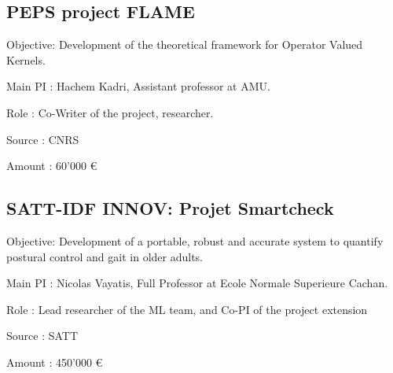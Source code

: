 \documentclass[letter,10pt]{article}
\begin{document}
\subsection{PEPS project FLAME}
\begin{zitemize}
\item Objective: Development of the theoretical framework for Operator Valued Kernels.
\item Main PI : Hachem Kadri, Assistant professor at AMU.
\item Role : Co-Writer of the project, researcher.
\item Source : CNRS
\item Amount : 60'000 \euro
\end{zitemize}

\subsection{SATT-IDF INNOV: Projet Smartcheck}
\begin{zitemize}
\item Objective: Development of a portable, robust and accurate system to quantify postural control and gait in older adults.
\item Main PI : Nicolas Vayatis, Full Professor at Ecole Normale Superieure Cachan.
\item Role : Lead researcher of the ML team, and Co-PI of the project extension
\item Source : SATT
\item Amount : 450'000 \euro
\end{zitemize}
\end{document}
